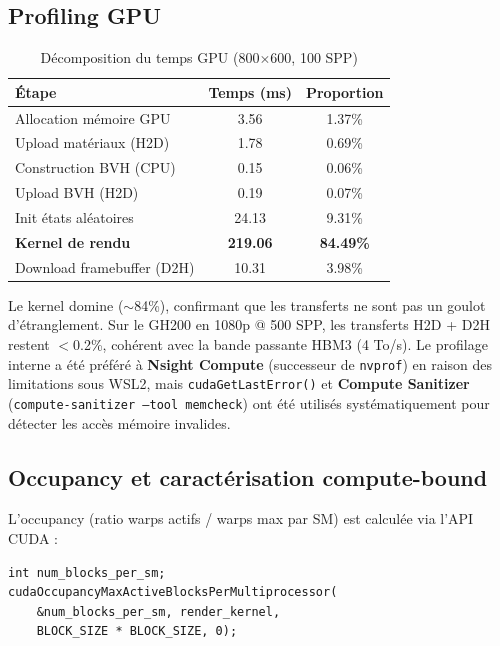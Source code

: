 \documentclass[12pt,a4paper]{article}
\begin{document}
\subsection{Profiling GPU}

\begin{table}[H]
\centering
\caption{Décomposition du temps GPU (800$\times$600, 100 SPP)}
\begin{tabular}{lcc}
\toprule
\textbf{Étape} & \textbf{Temps (ms)} & \textbf{Proportion} \\
\midrule
Allocation mémoire GPU & 3.56 & 1.37\% \\
Upload matériaux (H2D) & 1.78 & 0.69\% \\
Construction BVH (CPU) & 0.15 & 0.06\% \\
Upload BVH (H2D) & 0.19 & 0.07\% \\
Init états aléatoires & 24.13 & 9.31\% \\
\textbf{Kernel de rendu} & \textbf{219.06} & \textbf{84.49\%} \\
Download framebuffer (D2H) & 10.31 & 3.98\% \\
\bottomrule
\end{tabular}
\label{tab:profiling}
\end{table}

Le kernel domine ($\sim$84\%), confirmant que les transferts ne sont pas un goulot d'étranglement. Sur le GH200 en 1080p @ 500 SPP, les transferts H2D + D2H restent $<$0.2\%, cohérent avec la bande passante HBM3 (4 To/s). Le profilage interne a été préféré à \textbf{Nsight Compute} (successeur de \texttt{nvprof}) en raison des limitations sous WSL2, mais \texttt{cudaGetLastError()} et \textbf{Compute Sanitizer} (\texttt{compute-sanitizer --tool memcheck}) ont été utilisés systématiquement pour détecter les accès mémoire invalides.

\subsection{Occupancy et caractérisation compute-bound}

L'occupancy (ratio warps actifs / warps max par SM) est calculée via l'API CUDA :

\begin{lstlisting}[caption={Calcul d'occupancy}]
int num_blocks_per_sm;
cudaOccupancyMaxActiveBlocksPerMultiprocessor(
    &num_blocks_per_sm, render_kernel,
    BLOCK_SIZE * BLOCK_SIZE, 0);
\end{lstlisting}
\end{document}

